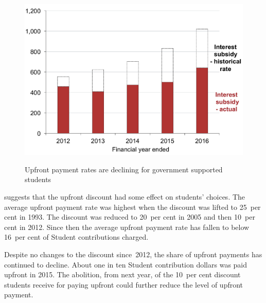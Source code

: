 \documentclass[embargoed]{grattan}
\begin{document}
\begin{figure}
\caption{Upfront payment rates are declining for government supported students}\label{fig:fig6-upfront-payment-rates-are-declining-for-govt-supported-students}

\includegraphics[page=6]{atlas/Chartpack.pdf}

{\textcites{EducationvariousyearsHighereducationreport}{Education2016StudentsSelectedhigher}}
\end{figure}

 suggests that the upfront discount had some effect on students' choices.
The average upfront payment rate was highest when the discount was lifted to 25~per cent in 1993.
The discount was reduced to 20~per cent in 2005 and then 10~per cent in 2012.
Since then the average upfront payment rate has fallen to below 16~per cent of \gls{Student contribution}s charged.

Despite no changes to the discount since~2012, the share of upfront payments has continued to decline.
About one in ten \gls{Student contribution} dollars was paid upfront in 2015.
The abolition, from next year, of the 10~per cent discount students receive for paying upfront could further reduce the level of upfront payment.
\end{document}
